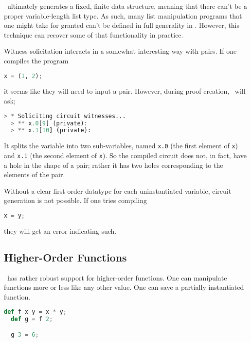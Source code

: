 \vampir\ ultimately generates a fixed, finite data structure, meaning that there can't be a proper variable-length list type. As such, many list manipulation programs that one might take for granted can't be defined in full generality in \vampir. However, this technique can recover some of that functionality in practice.

Witness solicitation interacts in a somewhat interesting way with pairs. If one compiles the program

\begin{lstlisting}[language=Python]
  x = (1, 2);
\end{lstlisting}

it seems like they will need to input a pair. However, during proof creation, \vampir\ will ask;

\begin{lstlisting}[language=Python]
  > * Soliciting circuit witnesses...
  > ** x.0[9] (private): 
  > ** x.1[10] (private): 
\end{lstlisting}

It splits the variable into two sub-variables, named \lstinline{x.0} (the first element of \lstinline{x}) and \lstinline{x.1} (the second element of \lstinline{x}). So the compiled circuit does not, in fact, have a hole in the shape of a pair; rather it has two holes corresponding to the elements of the pair.

Without a clear first-order datatype for each uninstantiated variable, circuit generation is not possible. If one tries compiling 

\begin{lstlisting}[language=Python]
  x = y;
\end{lstlisting}

they will get an error indicating such.






\subsection{Higher-Order Functions} \label{HOF}

\vampir\ has rather robust support for higher-order functions. One can manipulate functions more or less like any other value. One can save a partially instantiated function.

\begin{lstlisting}[language=Python]
  def f x y = x * y;
  def g = f 2;

  g 3 = 6;
\end{lstlisting}

